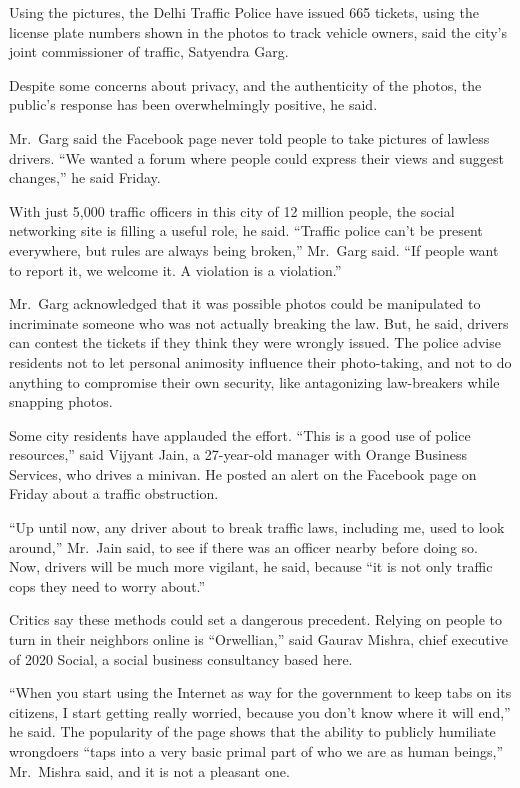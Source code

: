 ﻿\documentclass[12pt]{article}
\begin{document}
Using the pictures, the Delhi Traffic Police have issued 665 tickets, using the license plate
numbers shown in the photos to track vehicle owners, said the city's joint commissioner of traffic,
Satyendra Garg.

Despite some concerns about privacy, and the authenticity of the photos, the public's response has
been overwhelmingly positive, he said.

Mr.~Garg said the Facebook page never told people to take pictures of lawless drivers. ``We wanted a
forum where people could express their views and suggest changes,'' he said Friday.

With just 5,000 traffic officers in this city of 12 million people, the social networking site is
filling a useful role, he said. ``Traffic police can't be present everywhere, but rules are always
being broken,'' Mr.~Garg said. ``If people want to report it, we welcome it. A violation is a
violation.''

Mr.~Garg acknowledged that it was possible photos could be manipulated to incriminate someone who
was not actually breaking the law. But, he said, drivers can contest the tickets if they think they
were wrongly issued. The police advise residents not to let personal animosity influence their
photo-taking, and not to do anything to compromise their own security, like antagonizing
law-breakers while snapping photos.

Some city residents have applauded the effort. ``This is a good use of police resources,'' said
Vijyant Jain, a 27-year-old manager with Orange Business Services, who drives a minivan. He posted
an alert on the Facebook page on Friday about a traffic obstruction.

``Up until now, any driver about to break traffic laws, including me, used to look around,''
Mr.~Jain said, to see if there was an officer nearby before doing so. Now, drivers will be much more
vigilant, he said, because ``it is not only traffic cops they need to worry about.''

Critics say these methods could set a dangerous precedent. Relying on people to turn in their
neighbors online is ``Orwellian,'' said Gaurav Mishra, chief executive of 2020 Social, a social
business consultancy based here.

``When you start using the Internet as way for the government to keep tabs on its citizens, I start
getting really worried, because you don't know where it will end,'' he said. The popularity of the
page shows that the ability to publicly humiliate wrongdoers ``taps into a very basic primal part of
who we are as human beings,'' Mr.~Mishra said, and it is not a pleasant one.
\end{document}
